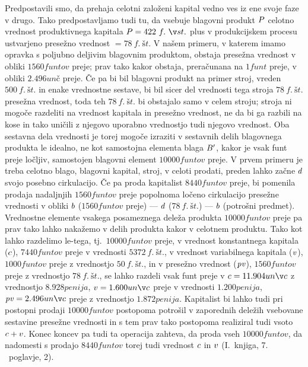\documentclass[kapital_02.tex]{subfiles}
\begin{document}
Predpostavili smo, da prehaja celotni založeni kapital vedno ves iz ene svoje faze v drugo. Tako predpostavljamo tudi tu, da vsebuje blagovni produkt \( P \) celotno vrednost produktivnega kapitala \( \KPEP = 422~f.~št. \) plus v produkcijskem procesu ustvarjeno presežno vrednost \( = 78~f.~št. \) V našem primeru, v katerem imamo opravka s poljubno deljivim blagovnim produktom, obstaja presežna vrednost v obliki \( 1560 funtov \) preje; prav tako kakor obstaja, preračunana na \( 1 funt \) preje, v obliki \( 2.496 unč \) preje. Če pa bi bil blagovni produkt na primer stroj, vreden \( 500~f.~št. \) in enake vrednostne sestave, bi bil sicer del vrednosti tega stroja \( 78~f.~št. \) presežna vrednost, toda teh \( 78~f.~št. \) bi obstajalo samo v celem stroju; stroja ni mogoče razdeliti na vrednost kapitala in presežno vrednost, ne da bi ga razbili na kose in tako uničili z njegovo uporabno vrednostjo tudi njegovo vrednost. Oba sestavna dela vrednosti je torej mogoče izraziti v sestavnih delih blagovnega produkta le idealno, ne kot samostojna elementa blaga \( B' \), kakor je vsak funt preje ločljiv, samostojen blagovni element \( 10000 funtov \) preje. V prvem primeru je treba celotno blago, blagovni kapital, stroj, v celoti prodati, preden lahko začne \( d \) svojo posebno cirkulacijo. Če pa proda kapitalist \( 8440 funtov \) preje, bi pomenila prodaja nadaljnjih \( 1560 funtov\) preje popolnoma ločeno cirkulacijo presežne vrednosti v obliki \( b \) (\( 1560 funtov \) preje) --- \( d \) (\( 78~f.~št.\)) --- \( b \) (potrošni predmet). Vrednostne elemente vsakega posameznega deleža produkta \( 10000 funtov \) preje pa prav tako lahko nakažemo v delih produkta kakor v celotnem produktu. Tako kot lahko razdelimo le-tega, tj.\ \( 10000 funtov \) preje, v vrednost konstantnega kapitala (\( c \)), \( 7440 funtov \) preje v vrednosti \( 5372~f.~št. \), v vrednost variabilnega kapitala (\( v \)), \( 1000 funtov \) preje z vrednostjo \( 50~f.~št. \), in v presežno vrednost (\( \mathit{pv} \)), \(1560 funtov \) preje z vrednostjo \( 78~f.~št. \), se lahko razdeli vsak funt preje v \( \KPEc = 11.904 unč \) z vrednostjo \( 8.928 penija \), \( \KPEv = 1.600 unč \) preje v vrednosti \( 1.200 penija \), \( \KPEpv = 2.496 unč \) preje z vrednostjo \( 1.872 penija \). Kapitalist bi lahko tudi pri postopni prodaji \( 10000 funtov \) postopoma potrošil v zaporednih deležih vsebovane sestavine presežne vrednosti in s tem prav tako postopoma realiziral tudi vsoto \( c + v \). Konec koncev pa tudi ta operacija zahteva, da proda vseh \( 10000 funtov \), da nadomesti s prodajo \( 8440 funtov \) torej tudi vrednost \( c \) in \( v \) (I.~knjiga, 7. ~poglavje, 2).
\end{document}
